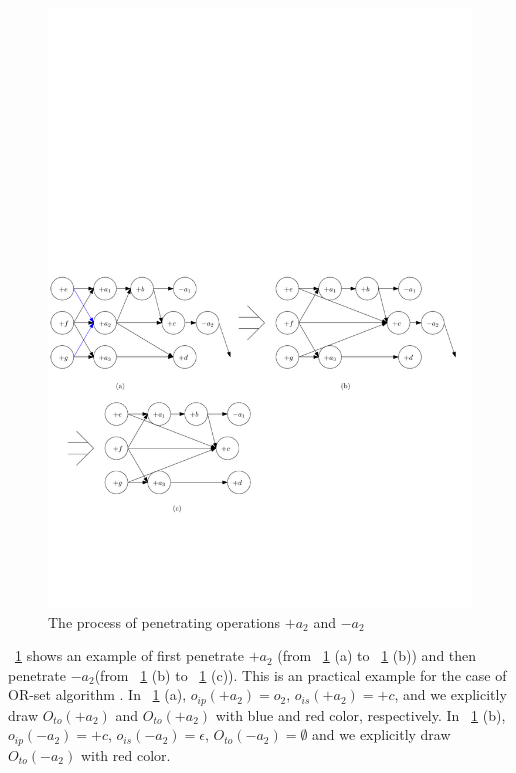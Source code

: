 {\begin{figure}[t]
  \centering
  \includegraphics[width=0.8 \textwidth]{figures/PIC-Example-CompactProcess.pdf}
  \caption{The process of penetrating operations $+a_2$ and $-a_2$}
  \label{fig:the process of penetrate operations}
\end{figure}

\figurename~\ref{fig:the process of penetrate operations} shows an example of first penetrate $+a_2$ (from \figurename~\ref{fig:the process of penetrate operations} (a) to \figurename~\ref{fig:the process of penetrate operations} (b)) and then penetrate $-a_2$(from \figurename~\ref{fig:the process of penetrate operations} (b) to \figurename~\ref{fig:the process of penetrate operations} (c)). This is an practical example for the case of OR-set algorithm \cite{Shapiro:2011,Bieniusa:2012}. In \figurename~\ref{fig:the process of penetrate operations} (a), $o_{ip}(+a_2) = o_2$, $o_{is}(+a_2) = +c$, and we explicitly draw $O_{to}(+a_2)$ and $O_{to}(+a_2)$ with blue and red color, respectively. In \figurename~\ref{fig:the process of penetrate operations} (b), $o_{ip}(-a_2) = +c$, $o_{is}(-a_2) = \epsilon$, $O_{to}(-a_2) = \emptyset$ and we explicitly draw $O_{to}(-a_2)$ with red color.

}
